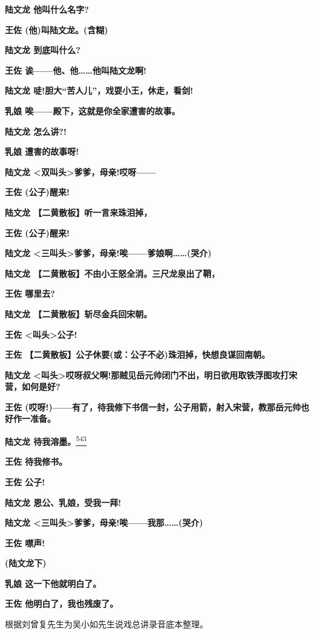 \textbf{陆文龙 他叫什么名字?}

\textbf{王佐 (他)叫陆文龙。(含糊)}

\textbf{陆文龙 到底叫什么?}

\textbf{王佐 诶------他、他\ldots{}\ldots{}他叫陆文龙啊!}

\textbf{陆文龙 唗!胆大``苦人儿''，戏耍小王，休走，看剑!}

\textbf{乳娘 唉------殿下，这就是你全家遭害的故事。}

\textbf{陆文龙 怎么讲?!}

\textbf{乳娘 遭害的故事呀!}

\textbf{陆文龙 \textless{}双叫头\textgreater{}爹爹，母亲!哎呀------}

\textbf{王佐 (公子)醒来!}

\textbf{陆文龙 【二黄散板】听一言来珠泪掉，}

\textbf{王佐 (公子)醒来!}

\textbf{陆文龙
\textless{}三叫头\textgreater{}爹爹，母亲!唉------爹娘啊\ldots{}\ldots{}(哭介)}

\textbf{陆文龙 【二黄散板】不由小王怒全消。三尺龙泉出了鞘，}

\textbf{王佐 哪里去?}

\textbf{陆文龙 【二黄散板】斩尽金兵回宋朝。}

\textbf{王佐 \textless{}叫头\textgreater{}公子!}

\textbf{王佐 【二黄散板】公子休要(或：公子不必)珠泪掉，快想良谋回南朝。}

\textbf{陆文龙
\textless{}叫头\textgreater{}哎呀叔父啊!那贼见岳元帅闭门不出，明日欲用取铁浮图攻打宋营，如何是好?}

\textbf{王佐
(哎呀!)------有了，待我修下书信一封，公子用箭，射入宋营，教那岳元帅也好作一准备。}

\textbf{陆文龙
待我溶墨。}\protect\hyperlink{fn543}{\textsuperscript{543}}

\textbf{王佐 待我修书。}

\textbf{王佐 公子!}

\textbf{陆文龙 恩公、乳娘，受我一拜!}

\textbf{陆文龙
\textless{}三叫头\textgreater{}爹爹，母亲!唉------我那\ldots{}\ldots{}(哭介)}

\textbf{王佐 噤声!}

\textbf{(陆文龙下)}

\textbf{乳娘 这一下他就明白了。}

\textbf{王佐 他明白了，我也残废了。}


\item
  \leavevmode\hypertarget{fn413}{}%
  根据刘曾复先生为吴小如先生说戏总讲录音底本整理。

